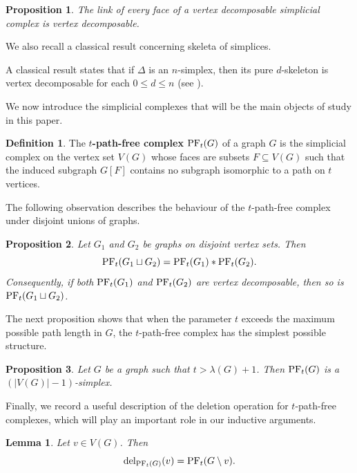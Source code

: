 \documentclass[12pt,reqno]{amsart}
\newtheorem{proposition}{Proposition}[section]
\newtheorem{lemma}[lemma]{Lemma}
\theoremstyle{definition}
\newtheorem{definition}[definition]{Definition}
\newcommand{\del}{{\mathrm{del}}}
\newcommand{\PF}{{\rm PF}}
\begin{document}
\begin{proposition}\label{prop:V.D. of lk}
The link of every face of a vertex decomposable simplicial complex is vertex decomposable.
\end{proposition}

We also recall a classical result concerning skeleta of simplices.

A classical result states that if $\Delta$ is an $n$-simplex, then its pure
$d$-skeleton is vertex decomposable for each $0\le d\le n$
(see \cite[Lemma 3.10]{RW09}).

\medskip

We now introduce the simplicial complexes that will be the main objects of study in this paper.

\begin{definition}
The \textbf{$t$-path-free complex} $\PF_t(G)$ of a graph $G$ is the simplicial complex on the vertex set $V(G)$ whose faces are subsets $F \subseteq V(G)$ such that the induced subgraph $G[F]$ contains no subgraph isomorphic to a path on $t$ vertices.
\end{definition}

\medskip

The following observation describes the behaviour of the $t$-path-free complex under disjoint unions of graphs.

\begin{proposition}\label{prop:disjoint graphs}
Let $G_1$ and $G_2$ be graphs on disjoint vertex sets. Then
\[
\PF_t(G_1 \sqcup G_2)
=
\PF_t(G_1) * \PF_t(G_2).
\]
Consequently, if both $\PF_t(G_1)$ and $\PF_t(G_2)$ are vertex decomposable, then so is $\PF_t(G_1 \sqcup G_2)$.
\end{proposition}

The next proposition shows that when the parameter $t$ exceeds the maximum possible path length in $G$, the $t$-path-free complex has the simplest possible structure.

\begin{proposition}\label{path free for max path}
Let $G$ be a graph such that $t > \lambda(G) + 1$. Then $\PF_t(G)$ is a $(|V(G)|-1)$-simplex.
\end{proposition}

Finally, we record a useful description of the deletion operation for $t$-path-free complexes, which will play an important role in our inductive arguments.

\begin{lemma}\label{lem:deletion}
Let $v \in V(G)$. Then
\[
\del_{\PF_t(G)}(v) = \PF_t(G \setminus v).
\]
\end{lemma}
\end{document}

